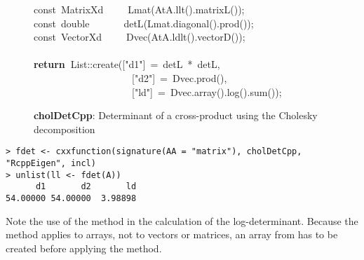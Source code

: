 \documentclass[shortnames,article]{jss}
\newcommand{\hlstd}[1]{\textcolor[rgb]{0,0,0}{#1}}
\newcommand{\hlopt}[1]{\textcolor[rgb]{0,0,0}{#1}}
\newcommand{\hlstr}[1]{\textcolor[rgb]{0.90,0.15,0.15}{#1}}
\newcommand{\hlkwa}[1]{\textcolor[rgb]{0.61,0.13,0.93}{\bf{#1}}}
\newcommand{\hlkwb}[1]{\textcolor[rgb]{0.13,0.54,0.13}{#1}}
\newcommand{\hlkwd}[1]{\textcolor[rgb]{0,0,0}{#1}}
\begin{document}
\begin{figure}[htb]
    \hlstd{}\hlkwb{const\ }\hlstd{MatrixXd}\hlstd{\ \ \ \ \ }\hlstd{}\hlkwd{Lmat}\hlstd{}\hlopt{(}\hlstd{AtA}\hlopt{.}\hlstd{}\hlkwd{llt}\hlstd{}\hlopt{().}\hlstd{}\hlkwd{matrixL}\hlstd{}\hlopt{());}\hspace*{\fill}\\
    \hlstd{}\hlkwb{const\ double}\hlstd{\ \ \ \ \ \ \ }\hlkwb{}\hlstd{}\hlkwd{detL}\hlstd{}\hlopt{(}\hlstd{Lmat}\hlopt{.}\hlstd{}\hlkwd{diagonal}\hlstd{}\hlopt{().}\hlstd{}\hlkwd{prod}\hlstd{}\hlopt{());}\hspace*{\fill}\\
    \hlstd{}\hlkwb{const\ }\hlstd{VectorXd}\hlstd{\ \ \ \ \ }\hlstd{}\hlkwd{Dvec}\hlstd{}\hlopt{(}\hlstd{AtA}\hlopt{.}\hlstd{}\hlkwd{ldlt}\hlstd{}\hlopt{().}\hlstd{}\hlkwd{vectorD}\hlstd{}\hlopt{());}\hspace*{\fill}\\
    \hlstd{}\hspace*{\fill}\\
    \hlkwa{return\ }\hlstd{List}\hlopt{::}\hlstd{}\hlkwd{create}\hlstd{}\hlopt{(}\hlstd{\textunderscore }\hlopt{{[}}\hlstd{}\hlstr{"d1"}\hlstd{}\hlopt{{]}\ =\ }\hlstd{detL\ }\hlopt{{*}\ }\hlstd{detL}\hlopt{,}\hspace*{\fill}\\
    \hlstd{}\hlstd{\ \ \ \ \ \ \ \ \ \ \ \ \ \ \ \ \ \ \ \ }\hlstd{\textunderscore }\hlopt{{[}}\hlstd{}\hlstr{"d2"}\hlstd{}\hlopt{{]}\ =\ }\hlstd{Dvec}\hlopt{.}\hlstd{}\hlkwd{prod}\hlstd{}\hlopt{(),}\hspace*{\fill}\\
    \hlstd{}\hlstd{\ \ \ \ \ \ \ \ \ \ \ \ \ \ \ \ \ \ \ \ }\hlstd{\textunderscore }\hlopt{{[}}\hlstd{}\hlstr{"ld"}\hlstd{}\hlopt{{]}\ =\ }\hlstd{Dvec}\hlopt{.}\hlstd{}\hlkwd{array}\hlstd{}\hlopt{().}\hlstd{}\hlkwd{log}\hlstd{}\hlopt{().}\hlstd{}\hlkwd{sum}\hlstd{}\hlopt{());}\hlstd{}\hspace*{\fill}
    \normalfont
    \normalsize
  \caption{\textbf{cholDetCpp}: Determinant of a cross-product using the Cholesky decomposition}
  \label{cholDet}
\end{figure}

\begin{verbatim}
> fdet <- cxxfunction(signature(AA = "matrix"), cholDetCpp, "RcppEigen", incl)
> unlist(ll <- fdet(A))
      d1       d2       ld 
54.00000 54.00000  3.98898 
\end{verbatim}


Note the use of the  method in the calculation of the
log-determinant.  Because the  method applies to arrays,
not to vectors or matrices, an array from  has to be created
before applying the  method.
\end{document}
